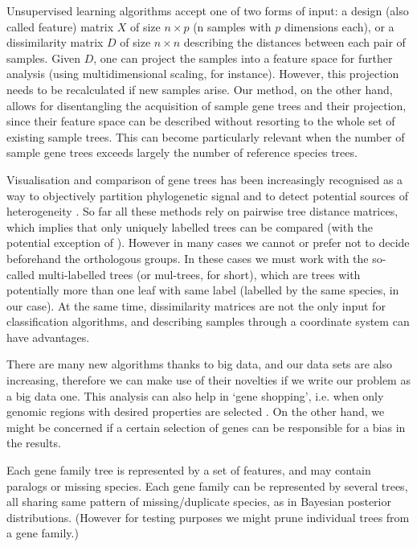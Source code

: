 Unsupervised learning algorithms accept one of two forms of input: a design (also called feature) matrix $X$ of size
$n\times p$ (n samples with $p$ dimensions each), or a dissimilarity matrix $D$ of size $n\times n$ 
describing the distances between each pair of samples. 
Given $D$, one can project the samples into a feature space for further analysis (using multidimensional
scaling, for instance). 
However, this projection needs to be recalculated if new samples arise. 
Our method, on the other
hand, allows for disentangling the acquisition of sample gene trees and their projection, since their feature space can
be described without resorting to the whole set of existing sample trees. 
This can become particularly relevant when the
number of sample gene trees exceeds largely the number of reference species trees.

Visualisation and comparison of gene trees has been increasingly recognised as a way to objectively partition
phylogenetic signal and to detect potential sources of heterogeneity \citep{Gori2016,Jombart2017, Huang2016}.
So far all these methods rely on pairwise tree distance matrices, which implies that only uniquely labelled
trees can be compared (with the potential exception of \cite{Kendall2018}). 
However in many cases we cannot or prefer not to decide beforehand the orthologous groups. 
In these cases we must work with  the so-called
multi-labelled trees (or mul-trees, for short), which are trees with potentially more than one leaf with same label
(labelled by the same species, in our case). 
At the same time, dissimilarity matrices are not the only input for
classification algorithms, and describing samples through a coordinate system can have advantages.

There are many new algorithms thanks to big data, and our data sets are also increasing, therefore we can make use of their
novelties if we write our problem as a big data one.
This analysis can also help in ‘gene shopping’, i.e. when
only genomic regions with desired properties are selected \citep{Smith2018}.
On the other hand, we might be concerned if a certain selection of genes can be responsible for a bias in the results.

Each gene family tree is represented by a set of features, and may contain paralogs or missing species. 
Each gene family
can be represented by several trees, all sharing same pattern of missing/duplicate species, as in Bayesian posterior
distributions. (However for testing purposes we might prune individual trees from a gene family.)

